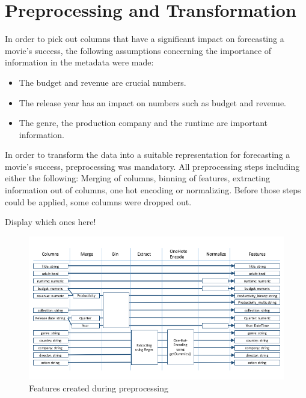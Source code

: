 \chapter{Preprocessing and Transformation}
\label{cha:preprocessing_transformation}

In order to pick out columns that have a significant impact on forecasting a movie's success, the following assumptions concerning the importance of information in the metadata were made:
\begin{itemize}
	\item The budget and revenue are crucial numbers.
	\item The release year has an impact on numbers such as budget and revenue.
	\item The genre, the production company and the runtime are important information.
\end{itemize}

In order to transform the data into a suitable representation for forecasting a movie's success, preprocessing was mandatory. All preprocessing steps including either the following: Merging of columns, binning of features, extracting information out of columns, one hot encoding or normalizing. Before those steps could be applied, some columns were dropped out.

Display which ones here!


\begin{figure}
\includegraphics[width=\textwidth]{images/3_features.png}
\caption{Features created during preprocessing}
\label{img:features}
\end{figure}


